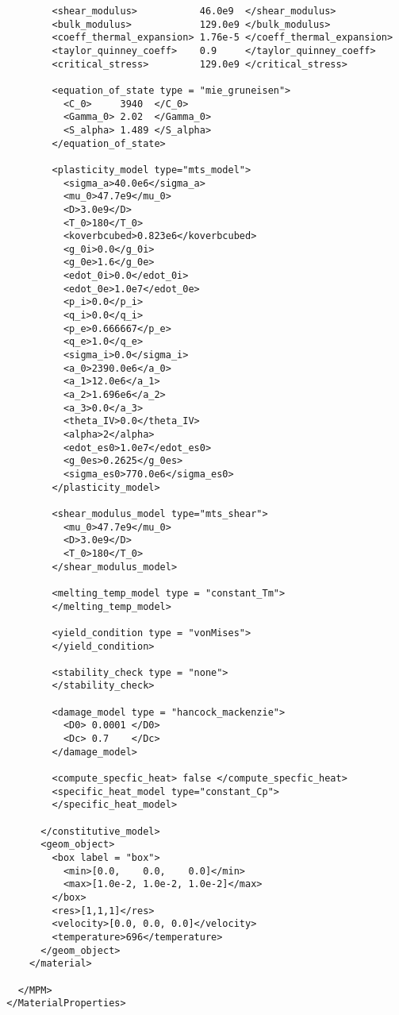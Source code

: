 \begin{lstlisting}
          <shear_modulus>           46.0e9  </shear_modulus>
          <bulk_modulus>            129.0e9 </bulk_modulus>
          <coeff_thermal_expansion> 1.76e-5 </coeff_thermal_expansion>
          <taylor_quinney_coeff>    0.9     </taylor_quinney_coeff>
          <critical_stress>         129.0e9 </critical_stress>

          <equation_of_state type = "mie_gruneisen">
            <C_0>     3940  </C_0>
            <Gamma_0> 2.02  </Gamma_0>
            <S_alpha> 1.489 </S_alpha>
          </equation_of_state>
          
          <plasticity_model type="mts_model">
            <sigma_a>40.0e6</sigma_a>
            <mu_0>47.7e9</mu_0>
            <D>3.0e9</D>
            <T_0>180</T_0>
            <koverbcubed>0.823e6</koverbcubed>
            <g_0i>0.0</g_0i>
            <g_0e>1.6</g_0e>
            <edot_0i>0.0</edot_0i>
            <edot_0e>1.0e7</edot_0e>
            <p_i>0.0</p_i>
            <q_i>0.0</q_i>
            <p_e>0.666667</p_e>
            <q_e>1.0</q_e>
            <sigma_i>0.0</sigma_i>
            <a_0>2390.0e6</a_0>
            <a_1>12.0e6</a_1>
            <a_2>1.696e6</a_2>
            <a_3>0.0</a_3>
            <theta_IV>0.0</theta_IV>
            <alpha>2</alpha>
            <edot_es0>1.0e7</edot_es0>
            <g_0es>0.2625</g_0es>
            <sigma_es0>770.0e6</sigma_es0>
          </plasticity_model>

          <shear_modulus_model type="mts_shear">
            <mu_0>47.7e9</mu_0>
            <D>3.0e9</D>
            <T_0>180</T_0>
          </shear_modulus_model>

          <melting_temp_model type = "constant_Tm">
          </melting_temp_model>

          <yield_condition type = "vonMises">
          </yield_condition>

          <stability_check type = "none">
          </stability_check>

          <damage_model type = "hancock_mackenzie">
            <D0> 0.0001 </D0>
            <Dc> 0.7    </Dc>
          </damage_model>
          
          <compute_specfic_heat> false </compute_specfic_heat>
          <specific_heat_model type="constant_Cp">
          </specific_heat_model>
          
        </constitutive_model>
        <geom_object>
          <box label = "box">
            <min>[0.0,    0.0,    0.0]</min>
            <max>[1.0e-2, 1.0e-2, 1.0e-2]</max>
          </box>
          <res>[1,1,1]</res>
          <velocity>[0.0, 0.0, 0.0]</velocity>
          <temperature>696</temperature>
        </geom_object>
      </material>

    </MPM>
  </MaterialProperties>
  \end{lstlisting}

